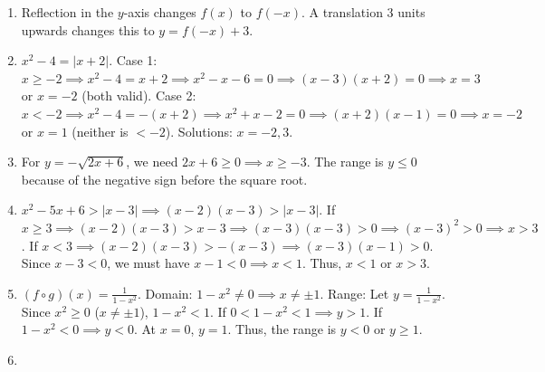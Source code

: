 \documentclass{article}
\begin{document}
\begin{enumerate}
    \item Reflection in the $y$-axis changes $f(x)$ to $f(-x)$. A translation 3 units upwards changes this to $y = f(-x) + 3$.
    \vspace{0.5cm}

    \item $x^2 - 4 = |x + 2|$.
    Case 1: $x \ge -2 \implies x^2 - 4 = x + 2 \implies x^2 - x - 6 = 0 \implies (x-3)(x+2) = 0 \implies x = 3$ or $x = -2$ (both valid).
    Case 2: $x < -2 \implies x^2 - 4 = -(x+2) \implies x^2 + x - 2 = 0 \implies (x+2)(x-1) = 0 \implies x = -2$ or $x = 1$ (neither is $< -2$).
    Solutions: $x = -2, 3$.
    \vspace{0.5cm}

    \item For $y = -\sqrt{2x+6}$, we need $2x+6 \ge 0 \implies x \ge -3$. The range is $y \le 0$ because of the negative sign before the square root.
    \vspace{0.5cm}

    \item $x^2 - 5x + 6 > |x - 3| \implies (x-2)(x-3) > |x-3|$.
    If $x \ge 3 \implies (x-2)(x-3) > x-3 \implies (x-3)(x-3) > 0 \implies (x-3)^2 > 0 \implies x > 3$.
    If $x < 3 \implies (x-2)(x-3) > -(x-3) \implies (x-3)(x-1) > 0$. Since $x-3 < 0$, we must have $x-1 < 0 \implies x < 1$.
    Thus, $x < 1$ or $x > 3$.
    \vspace{0.5cm}

    \item $(f \circ g)(x) = \frac{1}{1 - x^2}$.
    Domain: $1 - x^2 \neq 0 \implies x \neq \pm 1$.
    Range: Let $y = \frac{1}{1-x^2}$. Since $x^2 \ge 0$ ($x \neq \pm 1$), $1-x^2 < 1$.
    If $0 < 1-x^2 < 1 \implies y > 1$.
    If $1-x^2 < 0 \implies y < 0$.
    At $x=0$, $y=1$. Thus, the range is $y < 0$ or $y \ge 1$.
    \vspace{0.5cm}

    \item 
    \vspace{0.5cm}


\end{enumerate}
\end{document}
